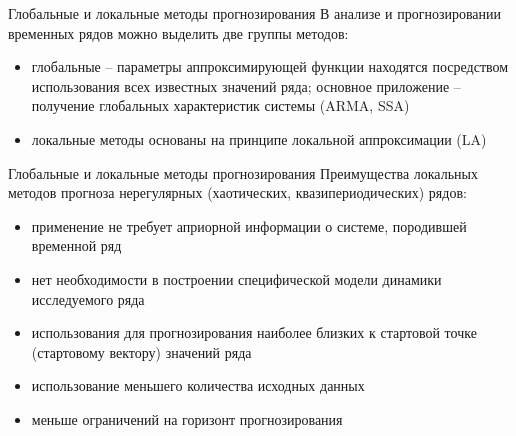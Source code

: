 \begin{frame}{Глобальные и локальные методы прогнозирования}
В анализе и прогнозировании временных рядов можно выделить две группы методов:
\begin{itemize}
    \item глобальные -- параметры аппроксимирующей функции находятся посредством использования всех известных значений ряда; основное приложение -- получение глобальных характеристик
    системы (ARMA, SSA)
    \item локальные методы основаны на принципе локальной аппроксимации (LA)
\end{itemize}
\end{frame}

\begin{frame}{Глобальные и локальные методы прогнозирования}
Преимущества локальных методов прогноза нерегулярных (хаотических, квазипериодических) рядов:
\begin{itemize}
    \item применение не требует априорной информации о системе, породившей временной ряд
    \item нет необходимости в построении специфической модели динамики исследуемого ряда
    \item использования для прогнозирования наиболее близких к стартовой
точке (стартовому вектору) значений ряда
    \item использование меньшего количества исходных данных
    \item меньше ограничений на горизонт прогнозирования
\end{itemize}

\end{frame}

